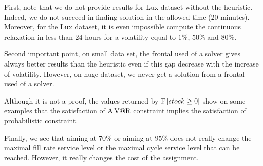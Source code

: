 First, note that we do not provide results for Lux dataset without the heuristic.
Indeed, we do not succeed in finding solution in the allowed time (20 minutes).
Moreover, for the Lux dataset, it is even impossible compute the continuous relaxation in less than 24 hours for a volatility equal to $1\%$, $50\%$ and $80\%$.


Second important point, on small data set, the frontal used of a solver gives always better results than the heuristic even if this gap decrease with the increase of volatility.
However, on huge dataset, we never get a solution from a frontal used of a solver.


Although it is not a proof, the values returned by $\prob\sqbracket{stock\ge0}$ show on some examples that the satisfaction of $\operatorname{A\operatorname{V@R}}$ constraint implies the satisfaction of probabilistic constraint.


Finally, we see that aiming at $70\%$ or aiming at $95\%$ does not really change the maximal fill rate service level or the maximal cycle service level that can be reached.
However, it really changes the cost of the assignment.




